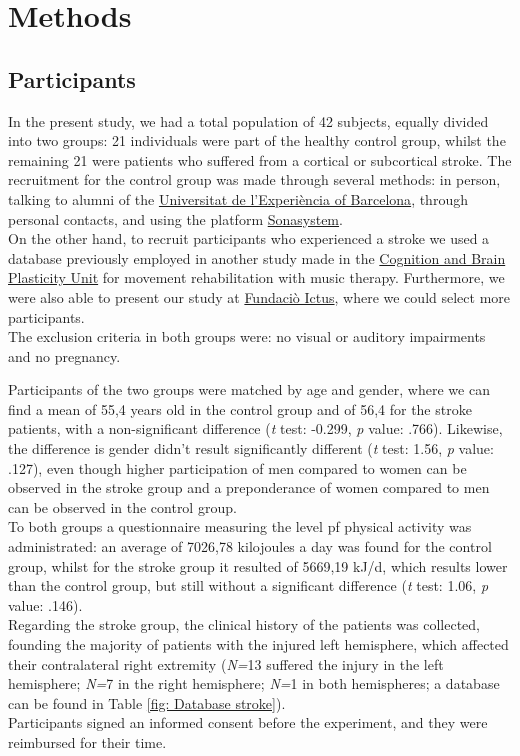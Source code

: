 \chapter{Methods}
\section{Participants}
In the present study, we had a total population of 42 subjects, equally divided into two groups: 21 individuals were part of the healthy control group, whilst the remaining 21 were patients who suffered from a cortical or subcortical stroke. The recruitment for the control group was made through several methods: in person, talking to alumni of the \href{https://www.experiencia.ub.edu/ca/}{Universitat de l'Experiència of Barcelona}, through personal contacts, and using the platform \href{https://www.sona-systems.com/}{Sonasystem}. \\
On the other hand, to recruit participants who experienced a stroke we used a database previously employed in another study made in the \href{https://brainvitge.org/}{Cognition and Brain Plasticity Unit} for movement rehabilitation with music therapy. Furthermore, we were also able to present our study at \href{https://www.fundacioictus.com/}{Fundaciò Ictus}, where we could select more participants. \\ 
The exclusion criteria in both groups were: no visual or auditory impairments and no pregnancy.

Participants of the two groups were matched by age and gender, where we can find a mean of 55,4 years old in the control group and of 56,4 for the stroke patients, with a non-significant difference (\textit{t} test: -0.299, \textit{p} value: .766). Likewise, the difference is gender didn't result significantly different (\textit{t} test: 1.56, \textit{p} value: .127), even though higher participation of men compared to women can be observed in the stroke group and a preponderance of women compared to men can be observed in the control group.\\ 
To both groups a questionnaire measuring the level pf physical activity was administrated: an average of 7026,78 kilojoules a day was found for the control group, whilst for the stroke group it resulted of 5669,19 kJ/d, which results lower than the control group, but still without a significant difference (\textit{t} test: 1.06, \textit{p} value: .146). \\
Regarding the stroke group, the clinical history of the patients was collected, founding the majority of patients with the injured left hemisphere, which affected their contralateral right extremity (\textit{N=}13 suffered the injury in the left hemisphere; \textit{N=}7 in the right hemisphere; \textit{N=}1 in both hemispheres; a database can be found in Table \ref{fig: Database stroke}).\\ 
Participants signed an informed consent before the experiment, and they were reimbursed for their time. 

